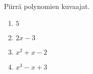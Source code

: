 %
%
%
%
%
%
%
%
%

\Harjoitustehtavat

\begin{tehtava}
    Piirrä polynomien kuvaajat.
    \begin{enumerate}
        \item $5$
        \item $2x-3$
        \item $x^2+x-2$
        \item $x^3-x+3$
    \end{enumerate}   
    \begin{vastaus}
    	\item \begin{kuvaajapohja}{0.4}{-4}{4}{-2}{6}
			  \end{kuvaajapohja}
    	\item \begin{kuvaajapohja}{0.4}{-4}{4}{-5}{3}
			  \end{kuvaajapohja}
		\item \begin{kuvaajapohja}{0.4}{-4}{4}{-2}{6}
			  \end{kuvaajapohja}
		\item \begin{kuvaajapohja}{0.4}{-4}{4}{-4}{4}
			  \end{kuvaajapohja}
    \end{vastaus}
\end{tehtava}


